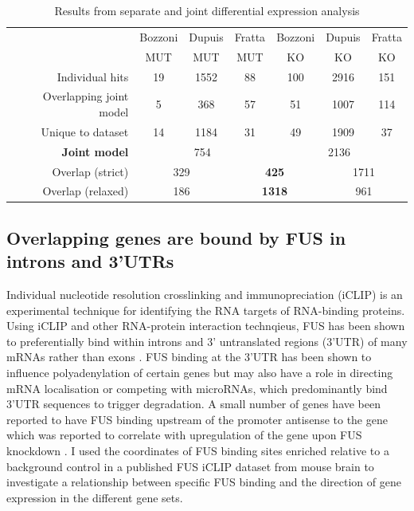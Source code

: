 \begingroup
\renewcommand{\arraystretch}{1.5}
\begin{table}[h!]
		\begin{tabular}{|r|ccc|ccc|}
			\hline
			& Bozzoni & Dupuis & Fratta & Bozzoni & Dupuis & Fratta\\[-0.3cm]
			& MUT & MUT & MUT & KO & KO & KO\\
			\hline
			Individual hits                & 19 & 1552 & 88 & 100 & 2916 & 151 \\
			Overlapping joint model & 5 & 368 & 57 & 51 & 1007 & 114 \\
			Unique to dataset          & 14 & 1184 & 31 & 49 & 1909 & 37 \\
			\hline
			\textbf{Joint model}       & \multicolumn{3}{c|}{754} & \multicolumn{3}{c|}{2136} \\
			\hline
			Overlap (strict)              & \multicolumn{2}{c}{329} & \multicolumn{2}{|c|}{\textbf{425}} & \multicolumn{2}{c|}{1711} \\
			Overlap (relaxed)           & \multicolumn{2}{c}{186} & \multicolumn{2}{|c|}{\textbf{1318} } & \multicolumn{2}{c|}{961} \\
			\hline
		\end{tabular}
	\caption{Results from separate and joint differential expression analysis}
	\label{tab:expression_results}
\end{table}
\endgroup


\subsection{ Overlapping genes are bound by FUS in introns and 3'UTRs}

Individual nucleotide resolution crosslinking and immunopreciation (iCLIP) is an experimental technique for identifying the RNA targets of RNA-binding proteins. 
Using iCLIP and other RNA-protein interaction technqieus, FUS has been shown to preferentially bind within introns and 3' untranslated regions (3'UTR) of many mRNAs rather than exons \citep{Lagier-Tourenne2012-wa, Rogelj2012, Ishigaki2012, Masuda2015a}. 
FUS binding at the 3'UTR has been shown to influence polyadenylation of certain genes \citep{Masuda2015a} but may also have a role in directing mRNA localisation or competing with microRNAs, which predominantly bind 3'UTR sequences to trigger degradation.
A small number of genes have been reported to have FUS binding upstream of the promoter antisense to the gene which was reported to correlate with upregulation of the gene upon FUS knockdown \citep{Ishigaki2012}.
I used the coordinates of FUS binding sites enriched relative to a background control in a published FUS iCLIP dataset from mouse brain \citep{Rogelj2012} to investigate a relationship between specific FUS binding and the direction of gene expression in the different gene sets.


